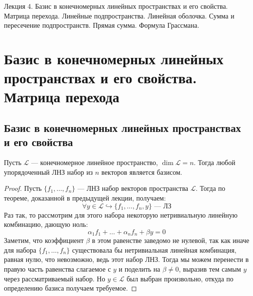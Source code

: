 \documentclass[11pt]{article}
\begin{document}
\begin{titlepage}
    \centering
    \vspace*{\fill}  %

    {\Huge Лекция 4. Базис в конечномерных линейных пространствах и его свойства. Матрица перехода. Линейные подпространства. Линейная оболочка. Сумма и пересечение подпространств. Прямая сумма. Формула Грассмана.
    \par}

    \vspace*{\fill}  %
\end{titlepage}

\setcounter{page}{1}

\section{Базис в конечномерных линейных пространствах и его свойства. Матрица перехода}

\subsection{Базис в конечномерных линейных пространствах и его свойства}

\begin{lemma} \label{lemma:1.1}
    Пусть $\mathcal{L}$ --- конечномерное линейное пространство, $\dim \mathcal{L} = n$. Тогда любой упорядоченный ЛНЗ набор из $n$ векторов является базисом. 
\end{lemma}

\begin{proof}
    Пусть $\{f_1, \ldots, f_n\}$ --- ЛНЗ набор векторов пространства $\mathcal{L}$. Тогда по теореме, 
    доказанной в предыдущей лекции, получаем:
    \[\forall y \in \mathcal{L} \hookrightarrow \{f_1, \ldots, f_n, y\} \text{ --- ЛЗ}\]
    Раз так, то рассмотрим для этого набора некоторую нетривиальную линейную комбинацию, дающую ноль:
    \[\alpha_1 f_1 + \ldots + \alpha_n f_n + \beta y = 0\]
    Заметим, что коэффициент $\beta$ в этом равенстве заведомо не нулевой, так как иначе для набора $\{f_1, \ldots, f_n\}$ существовала бы 
    нетривиальная линейная комбинация, равная нулю, что невозможно, ведь этот набор ЛНЗ. Тогда мы можем перенести в правую часть равенства 
    слагаемое с $y$ и поделить на $\beta \neq 0$, выразив тем самым $y$ через рассматриваемый набор. Но $y \in \mathcal{L}$ был выбран произвольно, 
    откуда по определению базиса получаем требуемое.
\end{proof}
\end{document}

